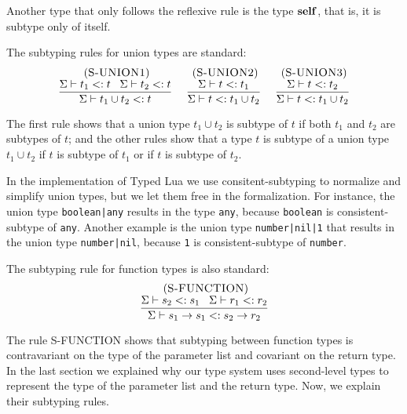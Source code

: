 Another type that only follows the reflexive rule is the type $\mathbf{self}$,
that is, it is subtype only of itself.

The subtyping rules for union types are standard:
\[
\begin{array}{c}
\begin{array}{c}
\; (\textsc{S-UNION1})\\
\dfrac{\Sigma \vdash t_{1} <: t \;\;\;
       \Sigma \vdash t_{2} <: t}
      {\Sigma \vdash t_{1} \cup t_{2} <: t}
\end{array}
\;
\begin{array}{c}
\; (\textsc{S-UNION2})\\
\dfrac{\Sigma \vdash t <: t_{1}}
      {\Sigma \vdash t <: t_{1} \cup t_{2}}
\end{array}
\;
\begin{array}{c}
\; (\textsc{S-UNION3})\\
\dfrac{\Sigma \vdash t <: t_{2}}
      {\Sigma \vdash t <: t_{1} \cup t_{2}}
\end{array}
\end{array}
\]

The first rule shows that a union type $t_{1} \cup t_{2}$
is subtype of $t$ if both $t_{1}$ and $t_{2}$ are subtypes
of $t$;
and the other rules show that a type $t$ is subtype
of a union type $t_{1} \cup t_{2}$ if $t$ is subtype of
$t_{1}$ or if $t$ is subtype of $t_{2}$.

In the implementation of Typed Lua we use consitent-subtyping to
normalize and simplify union types, but we let them free in the
formalization.
For instance, the union type \texttt{boolean|any} results in the
type \texttt{any}, because \texttt{boolean} is consistent-subtype
of \texttt{any}.
Another example is the union type \texttt{number|nil|1} that
results in the union type \texttt{number|nil}, because
\texttt{1} is consistent-subtype of \texttt{number}.

The subtyping rule for function types is also standard:
\[
\begin{array}{c}
\; (\textsc{S-FUNCTION})\\
\dfrac{\Sigma \vdash s_{2} <: s_{1} \;\;\;
       \Sigma \vdash r_{1} <: r_{2}}
      {\Sigma \vdash s_{1} \rightarrow s_{1} <: s_{2} \rightarrow r_{2}}
\end{array}
\]

The rule \textsc{S-FUNCTION} shows that subtyping between
function types is contravariant on the type of the parameter list
and covariant on the return type.
In the last section we explained why our type system uses
second-level types to represent the type of the parameter list
and the return type.
Now, we explain their subtyping rules.


